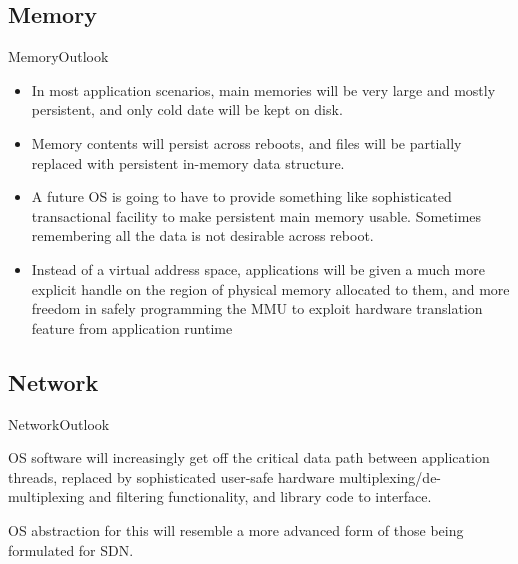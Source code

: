 \documentclass[10pt]{beamer}
\begin{document}
\subsection{Memory}
\begin{frame}{Memory}{Outlook}
  \begin{itemize}
    \item In most application scenarios, main memories will be very large and
          mostly persistent, and only cold date will be kept on disk. \pause
    \item Memory contents will persist across reboots, and files will be
          partially replaced with persistent in-memory data structure. \pause
    \item A future OS is going to have to provide something like sophisticated
          transactional facility to make persistent main memory usable.
          Sometimes remembering all the data is not desirable across reboot. \pause
    \item Instead of a virtual address space, applications will be given a much
          more explicit handle on the region of physical memory allocated to
          them, and more freedom in safely programming the MMU to exploit
          hardware translation feature from application runtime
  \end{itemize}
\end{frame}

\subsection{Network}
\begin{frame}{Network}{Outlook}
  \begin{block}{}
    OS software will increasingly get off the critical data path between
    application threads, replaced by sophisticated user-safe hardware
    multiplexing/de-multiplexing and filtering functionality, and library
    code to interface.
  \end{block}

  \begin{block}{}
    OS abstraction for this will resemble a more advanced form of those being
    formulated for SDN.
  \end{block}

\end{frame}
\end{document}

